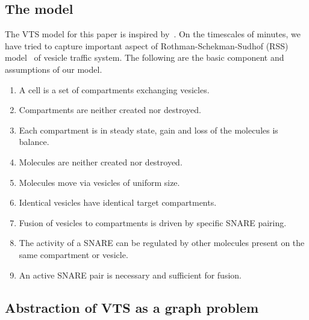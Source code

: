 \subsection{The model}
 The VTS model for this paper is inspired by~\cite{shukla2017discovering}. 
%
On the timescales of minutes, we have tried to capture important aspect of Rothman-Schekman-Sudhof (RSS) model~\cite{rothman2002machinery} of vesicle traffic system.
%
The following are the basic component and assumptions of our model. 
\begin{enumerate}
\item A cell is a set of compartments exchanging vesicles.
\item Compartments are neither created nor destroyed.
\item Each compartment is in steady state, gain and loss of the molecules is balance.
\item Molecules are neither created nor destroyed.
\item Molecules move via vesicles of uniform size.
\item Identical vesicles have identical target compartments.
\item Fusion of vesicles to compartments is driven by specific SNARE pairing.
\item The activity of a SNARE can be regulated by other molecules present on the same compartment or vesicle.
\item An active SNARE pair is necessary and sufficient for fusion. 
\end{enumerate}


\subsection{Abstraction of VTS as a graph problem}

